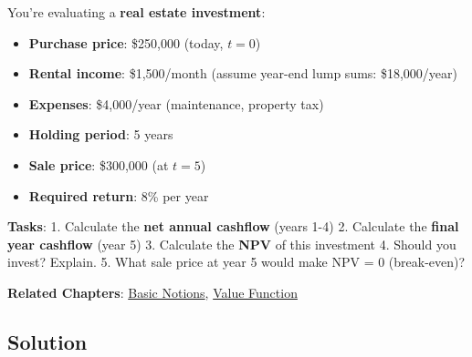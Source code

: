 \documentclass[
  letterpaper,
]{scrbook}
\providecommand{\tightlist}{%
  \setlength{\itemsep}{0pt}\setlength{\parskip}{0pt}}
\begin{document}
\begin{tcolorbox}[enhanced jigsaw, toptitle=1mm, colbacktitle=quarto-callout-note-color!10!white, opacityback=0, leftrule=.75mm, breakable, colframe=quarto-callout-note-color-frame, toprule=.15mm, opacitybacktitle=0.6, coltitle=black, bottomrule=.15mm, colback=white, arc=.35mm, titlerule=0mm, rightrule=.15mm, left=2mm, title=\textcolor{quarto-callout-note-color}{\faInfo}\hspace{0.5em}{Challenge Problem}, bottomtitle=1mm]

You're evaluating a \textbf{real estate investment}:

\begin{itemize}
\tightlist
\item
  \textbf{Purchase price}: \$250,000 (today, \(t=0\))
\item
  \textbf{Rental income}: \$1,500/month (assume year-end lump sums:
  \$18,000/year)
\item
  \textbf{Expenses}: \$4,000/year (maintenance, property tax)
\item
  \textbf{Holding period}: 5 years
\item
  \textbf{Sale price}: \$300,000 (at \(t=5\))
\item
  \textbf{Required return}: 8\% per year
\end{itemize}

\textbf{Tasks}: 1. Calculate the \textbf{net annual cashflow} (years
1-4) 2. Calculate the \textbf{final year cashflow} (year 5) 3. Calculate
the \textbf{NPV} of this investment 4. Should you invest? Explain. 5.
What sale price at year 5 would make NPV = 0 (break-even)?

\textbf{Related Chapters}: \hyperref[basic-notions]{Basic Notions},
\hyperref[value-function]{Value Function}

\end{tcolorbox}

\subsection*{Solution}\label{solution-4}
\end{document}
